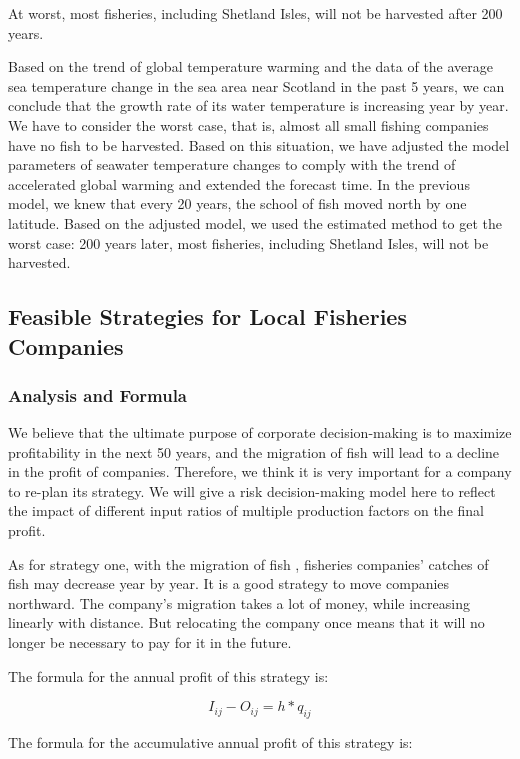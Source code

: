 \documentclass{mcmthesis}
\numberwithin{figure}{section}
\numberwithin{table}{section}
\begin{document}
At worst, most fisheries, including Shetland Isles, will not be harvested after 200 years.

Based on the trend of global temperature warming and the data of the average sea temperature change in the sea area near Scotland in the past 5 years, we can conclude that the growth rate of its water temperature is increasing year by year. We have to consider the worst case, that is, almost all small fishing companies have no fish to be harvested. Based on this situation, we have adjusted the model parameters of seawater temperature changes to comply with the trend of accelerated global warming and extended the forecast time. In the previous model, we knew that every 20 years, the school of fish moved north by one latitude. Based on the adjusted model, we used the estimated method to get the worst case: 200 years later, most fisheries, including Shetland Isles, will not be harvested.

\subsection{Feasible Strategies for Local Fisheries Companies}

\subsubsection{Analysis and Formula}
We believe that the ultimate purpose of corporate decision-making is to maximize profitability in the next 50 years, and the migration of fish will lead to a decline in the profit of companies. Therefore, we think it is very important for a company to re-plan its strategy. We will give a risk decision-making model here to reflect the impact of different input ratios of multiple production factors on the final profit.

As for strategy one, with the migration of fish , fisheries companies' catches of fish may decrease year by year. It is a good strategy to move companies northward. The company's migration takes a lot of money, while increasing linearly with distance. But relocating the company once means that it will no longer be necessary to pay for it in the future.

The formula for the annual profit of this strategy is:

\begin{equation}\label{1}
  I_{ij} - O_{ij} = h * q_{ij}
  \end{equation}

The formula for the accumulative annual profit of this strategy is:
\end{document}
